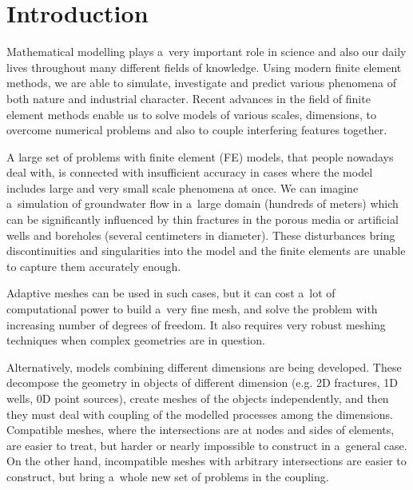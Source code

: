 \documentclass[bibliography=totocnumbered,dvipsnames,FM,Dis]{tulthesis_autoreferat}
\begin{document}


\chapter{Introduction}





Mathematical modelling plays a~very important role in science and also our daily lives throughout many different
fields of knowledge. Using modern finite element methods, we are able to simulate, investigate and predict
various phenomena of both nature and industrial character. Recent advances in the field of finite element methods
enable us to solve models of various scales, dimensions, to overcome numerical problems and also 
to couple interfering features together.

A large set of problems with finite element (FE) models, that people nowadays deal with, is connected with 
insufficient accuracy in cases where the model includes large and very small scale phenomena at once.
We can imagine a~simulation of groundwater flow in a~large domain (hundreds of meters) which can be significantly
influenced by thin fractures in the porous media or artificial wells and boreholes (several centimeters in diameter).
These disturbances bring discontinuities and singularities into the model and the finite elements are
unable to capture them accurately enough.

Adaptive meshes can be used in such cases, but it can cost a~lot of computational power to build a~very fine mesh,
and solve the problem with increasing number of degrees of freedom.
It also requires very robust meshing techniques when complex geometries are in question.

Alternatively, models combining different dimensions are being developed. These decompose the geometry
in objects of different dimension (e.g. 2D fractures, 1D wells, 0D point sources), create meshes of the objects independently,
and then they must deal with coupling of the modelled processes among the dimensions. 
Compatible meshes, where the intersections are at nodes and sides of elements, are easier to treat, but harder
or nearly impossible to construct in a~general case. On the other hand, incompatible meshes with arbitrary intersections are easier to construct, 
but bring a~whole new set of problems in the coupling.
\end{document}
